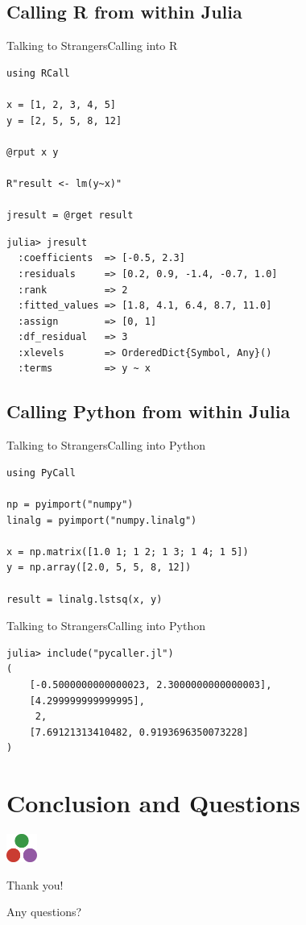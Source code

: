 \documentclass[11pt]{beamer}
\begin{document}
\subsection{Calling R from within Julia}
\begin{frame}[fragile]{Talking to Strangers}{Calling into R}
\begin{lstlisting}
using RCall

x = [1, 2, 3, 4, 5]
y = [2, 5, 5, 8, 12]

@rput x y

R"result <- lm(y~x)"

jresult = @rget result
\end{lstlisting}
\end{frame}

\begin{frame}[fragile]
\begin{lstlisting}
julia> jresult
  :coefficients  => [-0.5, 2.3]
  :residuals     => [0.2, 0.9, -1.4, -0.7, 1.0]
  :rank          => 2
  :fitted_values => [1.8, 4.1, 6.4, 8.7, 11.0]
  :assign        => [0, 1]
  :df_residual   => 3
  :xlevels       => OrderedDict{Symbol, Any}()
  :terms         => y ~ x
\end{lstlisting}
\end{frame}


\subsection{Calling Python from within Julia}
\begin{frame}[fragile]{Talking to Strangers}{Calling into Python}
\begin{lstlisting}
using PyCall

np = pyimport("numpy")
linalg = pyimport("numpy.linalg")

x = np.matrix([1.0 1; 1 2; 1 3; 1 4; 1 5])
y = np.array([2.0, 5, 5, 8, 12])

result = linalg.lstsq(x, y)
\end{lstlisting}
\end{frame}

\begin{frame}[fragile]{Talking to Strangers}{Calling into Python}
\begin{lstlisting}
julia> include("pycaller.jl")
(
	[-0.5000000000000023, 2.3000000000000003], 
	[4.299999999999995], 
	 2, 
	[7.69121313410482, 0.9193696350073228]
)
\end{lstlisting}
\end{frame}



\section{Conclusion and Questions}
\begin{frame}
\begin{center}
\includegraphics[width=1cm]{images/julia.png}

Thank you!

Any questions? \Coffeecup
\end{center}
\end{frame}
\end{document}
